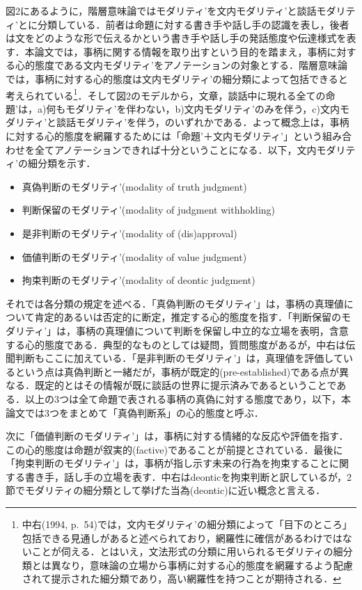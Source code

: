 \documentclass[japanese]{jnlp_1.4}
\begin{document}
図2にあるように，階層意味論ではモダリティ’を文内モダリティ’と談話モダリティ’とに分類している．前者は命題に対する書き手や話し手の認識を表し，後者は文をどのような形で伝えるかという書き手や話し手の発話態度や伝達様式を表す．本論文では，事柄に関する情報を取り出すという目的を踏まえ，事柄に対する心的態度である文内モダリティ’をアノテーションの対象とする．階層意味論では，事柄に対する心的態度は文内モダリティ’の細分類によって包括できると考えられている\footnote{中右(1994, p.~54)では，文内モダリティ’の細分類によって「目下のところ」包括できる見通しがあると述べられており，網羅性に確信があるわけではないことが伺える．とはいえ，文法形式の分類に用いられるモダリティの細分類とは異なり，意味論の立場から事柄に対する心的態度を網羅するよう配慮されて提示された細分類であり，高い網羅性を持つことが期待される．}．そして図2のモデルから，文章，談話中に現れる全ての命題’は，a)何もモダリティ’を伴わない，b)文内モダリティ’のみを伴う，c)文内モダリティ’と談話モダリティ’を伴う，のいずれかである．よって概念上は，事柄に対する心的態度を網羅するためには「命題’＋文内モダリティ’」という組み合わせを全てアノテーションできれば十分ということになる．以下，文内モダリティ’の細分類を示す．

\begin{itemize}
	\item 真偽判断のモダリティ’(modality of truth judgment)
	\item 判断保留のモダリティ’(modality of judgment withholding)
	\item 是非判断のモダリティ’(modality of (dis)approval)
	\item 価値判断のモダリティ’(modality of value judgment)
	\item 拘束判断のモダリティ’(modality of deontic judgment)
\end{itemize}

それでは各分類の規定を述べる．「真偽判断のモダリティ’」は，事柄の真理値について肯定的あるいは否定的に断定，推定する心的態度を指す．「判断保留のモダリティ’」は，事柄の真理値について判断を保留し中立的な立場を表明，含意する心的態度である．典型的なものとしては疑問，質問態度があるが，中右は伝聞判断もここに加えている．「是非判断のモダリティ’」は，真理値を評価しているという点は真偽判断と一緒だが，事柄が既定的(pre-established)である点が異なる．既定的とはその情報が既に談話の世界に提示済みであるということである．以上の3つは全て命題で表される事柄の真偽に対する態度であり，以下，本論文では3つをまとめて「真偽判断系」の心的態度と呼ぶ．

次に「価値判断のモダリティ’」は，事柄に対する情緒的な反応や評価を指す．この心的態度は命題が叙実的(factive)であることが前提とされている．最後に「拘束判断のモダリティ’」は，事柄が指し示す未来の行為を拘束することに関する書き手，話し手の立場を表す．中右はdeonticを拘束判断と訳しているが，2節でモダリティの細分類として挙げた当為(deontic)に近い概念と言える．
\end{document}
